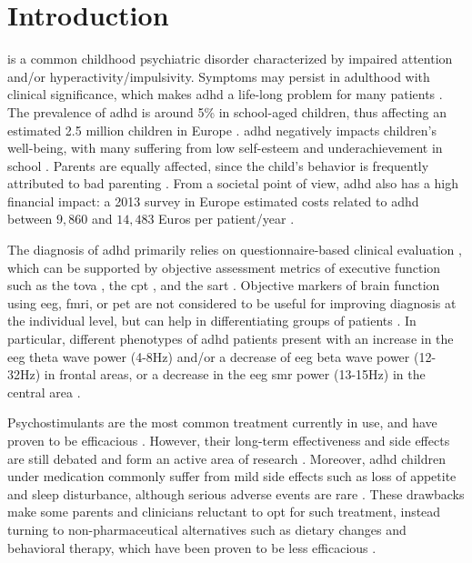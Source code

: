 

\section{Introduction} 

 is a common childhood psychiatric disorder characterized by impaired attention and/or hyperactivity/impulsivity.
Symptoms may persist in adulthood with clinical significance, which makes \gls{adhd} a life-long problem for many
patients \citep{Faraone2006}. The prevalence of \gls{adhd} is around 5\% in school-aged children, thus affecting an estimated
2.5 million children in Europe \citep{DSM-5}. \gls{adhd} negatively impacts children's well-being, with many suffering
from low self-esteem \citep{Shaw2005} and underachievement in school \citep{Barry2002}. Parents are equally affected, since 
the child's behavior is frequently attributed to bad parenting \citep{Harpin2005}. From a societal point
of view, \gls{adhd} also has a high financial impact: a 2013 survey in Europe estimated costs related to \gls{adhd} between $9,860$ and 
$14,483$ Euros per patient/year \citep{le2014}. 

The diagnosis of \gls{adhd} primarily relies on questionnaire-based clinical evaluation \citep{DSM-5}, which can be
supported by objective assessment metrics of executive function such as the \gls{tova} \citep{Forbes1998}, the
\gls{cpt} \citep{Barkley1991}, and the \gls{sart} \citep{Robertson1997}. Objective markers of brain function
using \gls{eeg}, \gls{fmri}, or \gls{pet} are not considered to be useful for improving diagnosis at the individual
level, but can help in differentiating groups of patients \citep{Johnstone2005}.  
In particular, different phenotypes of \gls{adhd} patients present with an increase in the \gls{eeg} theta wave 
power (4-8Hz) and/or a decrease of \gls{eeg} beta wave power (12-32Hz) in frontal areas, or a decrease in the \gls{eeg} 
\gls{smr} power (13-15Hz) in the central area \citep{Monastra2005, Matouvsek1984, Janzen1995, loo2017}.  

Psychostimulants are the most common treatment currently in use, and have proven to be efficacious
\citep{Taylor2014, Storebo2015}. However, their long-term effectiveness and side effects are still debated and form 
an active area of research \citep{DuPaul1998, Swanson2001, Jensen1999, Su2016, Becker2016}. Moreover, \gls{adhd} children under medication 
commonly suffer from mild side effects such as loss of appetite and sleep disturbance, although serious adverse events
are rare \citep{Storebo2015, Cooper2011}. These drawbacks make some parents and clinicians reluctant to 
opt for such treatment, instead turning to non-pharmaceutical alternatives such as dietary changes \citep{Belanger2009} and behavioral 
therapy, which have been proven to be less efficacious \citep{Sonuga-Barke2013}.

